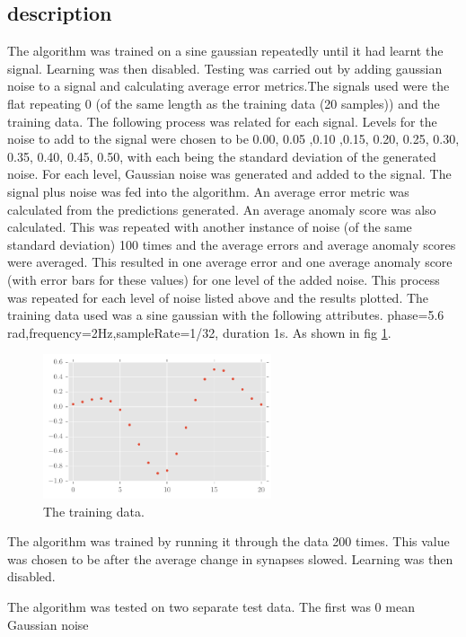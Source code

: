 \documentclass[a4paper]{jpconf}
\begin{document}
	\subsection{description}
		The algorithm was trained on a sine gaussian repeatedly until it had learnt the signal. Learning was then disabled. Testing was carried out by adding gaussian noise to a signal and calculating average error metrics.The signals used were the flat repeating 0 (of the same length as the training data (20 samples)) and the training data.
		The following process was related for each signal. Levels for the noise to add to the signal were chosen to be 0.00, 0.05 ,0.10 ,0.15, 0.20, 0.25, 0.30, 0.35, 0.40, 0.45, 0.50, with each being the standard deviation of the generated noise. For each level, Gaussian noise was generated and added to the signal. The signal plus noise was fed into the algorithm. An average error metric was calculated from the predictions generated. An average anomaly score was also calculated. This was repeated with another instance of noise (of the same standard deviation) 100 times and the average errors and average anomaly scores were averaged. This resulted in one average error and one average anomaly score (with error bars for these values) for one level of the added noise. This process was repeated for each level of noise listed above and the results plotted. 
		The training data used was a sine gaussian with the following attributes. phase=5.6 rad,frequency=2Hz,sampleRate=1/32, duration 1s. As shown in fig \ref{fig:trimmedGlitch1}.
		\begin{figure}
			\centering
			\includegraphics[width=0.6\textwidth]{trimmedGlitch1Plot.pdf}
			\caption{\label{fig:trimmedGlitch1}The training data.}
		\end{figure}
		
		The algorithm was trained by running it through the data 200 times. This value was chosen to be after the average change in synapses slowed. Learning was then disabled.
		
		The algorithm was tested on two separate test data. The first was 0 mean Gaussian noise 
\end{document}
